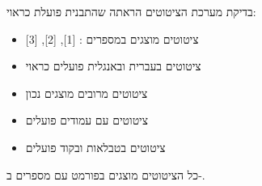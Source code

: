 \documentclass{hebrew-academic-template}
\begin{document}
בדיקת מערכת הציטוטים הראתה שהתבנית פועלת כראוי:

\begin{itemize}
    \item ציטוטים מוצגים במספרים : [1], [2], [3]
    \item ציטוטים בעברית ובאנגלית פועלים כראוי
    \item ציטוטים מרובים מוצגים נכון
    \item ציטוטים עם עמודים פועלים
    \item ציטוטים בטבלאות ובקוד פועלים
\end{itemize}

כל הציטוטים \cite{devlin2018bert,vaswani2017attention,hebrew_nlp_2023,hebrew_linguistics_2022} מוצגים בפורמט  עם מספרים ב-.


\newpage
\printhebrewbibliography
\printenglishbibliography
\end{document}
